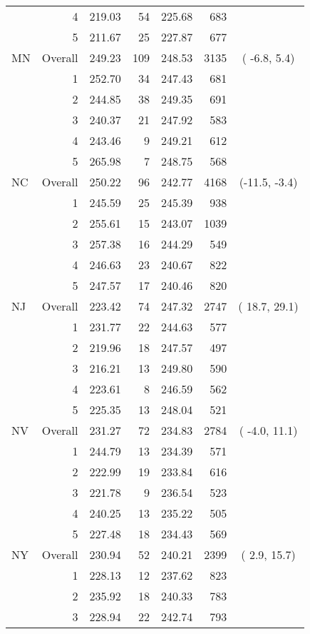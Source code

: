 \begin{longtable}{lrrr@{\extracolsep{.25cm}}rrc}
   & 4 & 219.03 &  54 & 225.68 & 683 &  \\ 
   & 5 & 211.67 &  25 & 227.87 & 677 &  \\ 
   \hline
MN & Overall & 249.23 & 109 & 248.53 & 3135 & ( -6.8,  5.4) \\ 
   & 1 & 252.70 &  34 & 247.43 & 681 &  \\ 
   & 2 & 244.85 &  38 & 249.35 & 691 &  \\ 
   & 3 & 240.37 &  21 & 247.92 & 583 &  \\ 
   & 4 & 243.46 &   9 & 249.21 & 612 &  \\ 
   & 5 & 265.98 &   7 & 248.75 & 568 &  \\ 
   \hline
NC & Overall & 250.22 &  96 & 242.77 & 4168 & (-11.5, -3.4) \\ 
   & 1 & 245.59 &  25 & 245.39 & 938 &  \\ 
   & 2 & 255.61 &  15 & 243.07 & 1039 &  \\ 
   & 3 & 257.38 &  16 & 244.29 & 549 &  \\ 
   & 4 & 246.63 &  23 & 240.67 & 822 &  \\ 
   & 5 & 247.57 &  17 & 240.46 & 820 &  \\ 
   \hline
NJ & Overall & 223.42 &  74 & 247.32 & 2747 & ( 18.7, 29.1) \\ 
   & 1 & 231.77 &  22 & 244.63 & 577 &  \\ 
   & 2 & 219.96 &  18 & 247.57 & 497 &  \\ 
   & 3 & 216.21 &  13 & 249.80 & 590 &  \\ 
   & 4 & 223.61 &   8 & 246.59 & 562 &  \\ 
   & 5 & 225.35 &  13 & 248.04 & 521 &  \\ 
   \hline
NV & Overall & 231.27 &  72 & 234.83 & 2784 & ( -4.0, 11.1) \\ 
   & 1 & 244.79 &  13 & 234.39 & 571 &  \\ 
   & 2 & 222.99 &  19 & 233.84 & 616 &  \\ 
   & 3 & 221.78 &   9 & 236.54 & 523 &  \\ 
   & 4 & 240.25 &  13 & 235.22 & 505 &  \\ 
   & 5 & 227.48 &  18 & 234.43 & 569 &  \\ 
   \hline
NY & Overall & 230.94 &  52 & 240.21 & 2399 & (  2.9, 15.7) \\ 
   & 1 & 228.13 &  12 & 237.62 & 823 &  \\ 
   & 2 & 235.92 &  18 & 240.33 & 783 &  \\ 
   & 3 & 228.94 &  22 & 242.74 & 793 &  \\ 

\end{longtable}
